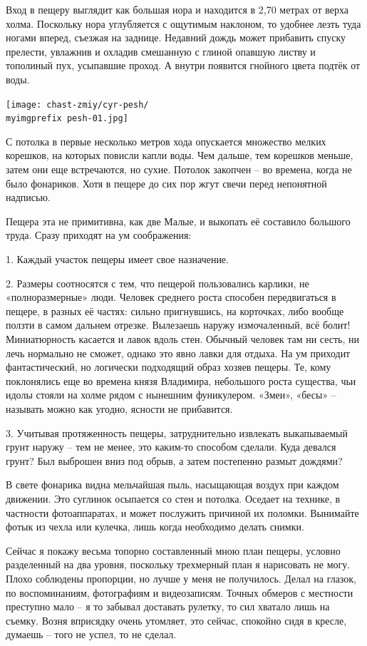 Вход в пещеру выглядит как большая нора и находится в 2,70 метрах от верха холма. Поскольку нора углубляется с ощутимым наклоном, то удобнее лезть туда ногами вперед, съезжая на заднице. Недавний дождь может прибавить спуску прелести, увлажнив и охладив смешанную с глиной опавшую листву и тополиный пух, усыпавшие проход. А внутри появится гнойного цвета подтёк от воды.

\begin{center}
\texttt{[image: chast-zmiy/cyr-pesh/\\myimgprefix pesh-01.jpg]}
\end{center}

С потолка в первые несколько метров хода опускается множество мелких корешков, на которых повисли капли воды. Чем дальше, тем корешков меньше, затем они еще встречаются, но сухие. Потолок закопчен – во времена, когда не было фонариков. Хотя в пещере до сих пор жгут свечи перед непонятной надписью.

Пещера эта не примитивна, как две Малые, и выкопать её составило большого труда. Сразу приходят на ум соображения:

1. Каждый участок пещеры имеет свое назначение.

2. Размеры соотносятся с тем, что пещерой  пользовались карлики, не «полноразмерные» люди. Человек среднего роста способен передвигаться в пещере, в разных её частях: сильно пригнувшись, на корточках, либо вообще ползти в самом дальнем отрезке. Вылезаешь наружу измочаленный, всё болит! Миниатюрность касается и лавок вдоль стен. Обычный человек там ни сесть, ни лечь нормально не сможет, однако это явно лавки для отдыха. На ум приходит фантастический, но логически подходящий образ хозяев пещеры. Те, кому поклонялись еще во времена князя Владимира, небольшого роста существа, чьи идолы стояли на холме рядом с нынешним фуникулером. «Змеи», «бесы» – называть можно как угодно, ясности не прибавится.

3. Учитывая протяженность пещеры, затруднительно извлекать выкапываемый грунт наружу – тем не менее, это каким-то способом сделали. Куда девался грунт? Был выброшен вниз под обрыв, а затем постепенно размыт дождями?

В свете фонарика видна мельчайшая пыль, насыщающая воздух при каждом движении. Это суглинок осыпается со стен и потолка. Оседает на технике, в частности фотоаппаратах, и может послужить причиной их поломки. Вынимайте фотык из чехла или кулечка, лишь когда необходимо делать снимки.

Сейчас я покажу весьма топорно составленный мною план пещеры, условно разделенный на два уровня, поскольку трехмерный план я нарисовать не могу. Плохо соблюдены пропорции, но лучше у меня не получилось. Делал на глазок, по воспоминаниям, фотографиям и видеозаписям. Точных обмеров с местности преступно мало – я то забывал доставать рулетку, то сил хватало лишь на съемку. Возня вприсядку очень утомляет, это сейчас, спокойно сидя в кресле, думаешь – того не успел, то не сделал. 

